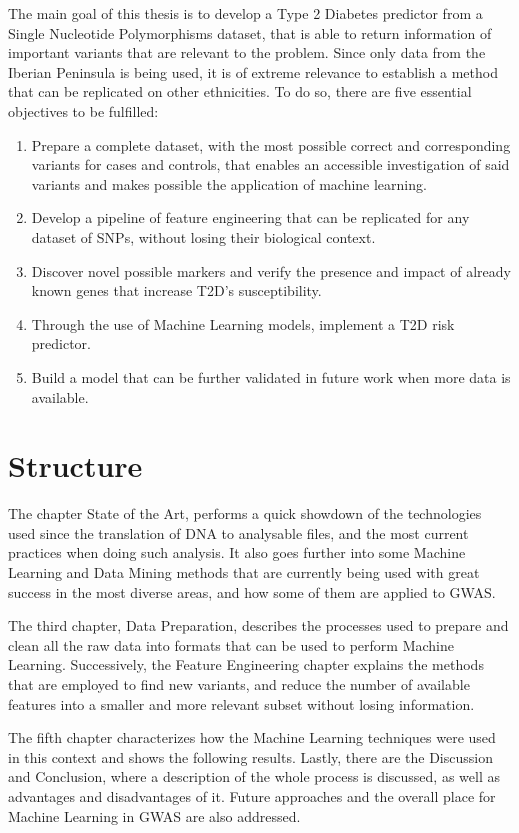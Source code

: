 The main goal of this thesis is to develop a Type 2 Diabetes predictor from a Single Nucleotide Polymorphisms dataset, that is able to return information of important variants that are relevant to the problem. Since only data from the Iberian Peninsula is being used, it is of extreme relevance to establish a method that can be replicated on other ethnicities. To do so, there are five essential objectives to be fulfilled:
\begin{enumerate}
	\item Prepare a complete dataset, with the most possible correct and corresponding variants for cases and controls, that enables an accessible investigation of said variants and makes possible the application of machine learning.
	\item Develop a pipeline of feature engineering that can be replicated for any dataset of SNPs, without losing their biological context.
	\item Discover novel possible markers and verify the presence and impact of already known genes that increase T2D's susceptibility.
	\item Through the use of Machine Learning models, implement a T2D risk predictor. 
	\item Build a model that can be further validated in future work when more data is available.
\end{enumerate}


\section{Structure}

The chapter State of the Art, performs a quick showdown of the technologies used since the translation of \gls{DNA} to analysable files, and the most current practices when doing such analysis. It also goes further into some Machine Learning and Data Mining methods that are currently being used with great success in the most diverse areas, and how some of them are applied to \gls{GWAS}. 

The third chapter, Data Preparation, describes the processes used to prepare and clean all the raw data into formats that can be used to perform Machine Learning. Successively, the Feature Engineering chapter explains the methods that are employed to find new variants, and reduce the number of available features into a smaller and more relevant subset without losing information.

The fifth chapter characterizes how the Machine Learning techniques were used in this context and shows the following results. Lastly, there are the Discussion and Conclusion, where a description of the whole process is discussed, as well as advantages and disadvantages of it. Future approaches and the overall place for Machine Learning in \gls{GWAS} are also addressed.